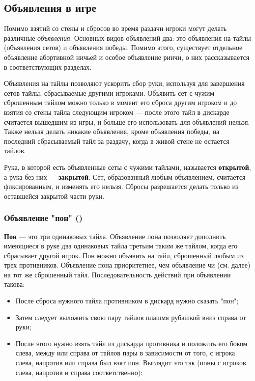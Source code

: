 \subsection{Объявления в игре}

Помимо взятий со стены и сбросов во время раздачи игроки могут делать различные \textit{объявления}. Основных видов объявлений два: это объявления на тайлы (объявления сетов) и объявления победы. Помимо этого, существует отдельное объявление абортивной ничьей и особое объявление риичи, о них рассказывается в соответствующих разделах.

Объявления на тайлы позволяют ускорить сбор руки, используя для завершения сетов тайлы, сбрасываемые другими игроками. Объявить сет с чужим сброшенным тайлом можно только в момент его сброса другим игроком и до взятия со стены тайла следующим игроком --- после этого тайл в дискарде считается вышедшим из игры, и больше его использовать для объявлений нельзя. Также нельзя делать никакие объявления, кроме объявления победы, на последний сбрасываемый тайл за раздачу, когда в живой стене не остается тайлов.

Рука, в которой есть объявленные сеты с чужими тайлами, называется \textbf{открытой}, а рука без них --- \textbf{закрытой}. Сет, образованный любым объявлением, считается фиксированным, и изменять его нельзя. Сбросы разрешается делать только из оставшейся закрытой части руки.

\subsubsection{Объявление "пон" ()}

\textbf{Пон} --- это три одинаковых тайла. Объявление пона позволяет дополнить имеющиеся в руке два одинаковых тайла третьим таким же тайлом, когда его сбрасывает другой игрок. Пон можно объявить на тайл, сброшенный любым из трех противников. Объявление пона приоритетнее, чем объявление чи (см. далее) на тот же сброшенный тайл. Последовательность действий при объявлении такова:

\begin{itemize}
	\item После сброса нужного тайла противником в дискард нужно сказать "пон";
	\item Затем следует выложить свою пару тайлов плашмя рубашкой вниз справа от руки;
	\item После этого нужно взять тайл из дискарда противника и положить его боком слева, между или справа от тайлов пары в зависимости от того, с игрока слева, напротив или справа был взят пон. Выглядит это так (поны с игроков слева, напротив и справа соответственно):
\end{itemize}

